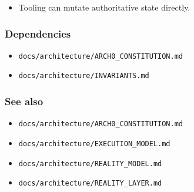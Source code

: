 \documentclass[9pt,a4paper,openany]{book}
\begin{document}
\begin{itemize}
\item Tooling can mutate authoritative state directly.\allowbreak{}
\end{itemize}





\subsubsection{Dependencies}


\begin{itemize}
\item \texttt{docs/\allowbreak{}architecture/\allowbreak{}ARCH0\_\allowbreak{}CONSTITUTION.\allowbreak{}md}
\end{itemize}


\begin{itemize}
\item \texttt{docs/\allowbreak{}architecture/\allowbreak{}INVARIANTS.\allowbreak{}md}
\end{itemize}





\subsubsection{See also}


\begin{itemize}
\item \texttt{docs/\allowbreak{}architecture/\allowbreak{}ARCH0\_\allowbreak{}CONSTITUTION.\allowbreak{}md}
\end{itemize}


\begin{itemize}
\item \texttt{docs/\allowbreak{}architecture/\allowbreak{}EXECUTION\_\allowbreak{}MODEL.\allowbreak{}md}
\end{itemize}


\begin{itemize}
\item \texttt{docs/\allowbreak{}architecture/\allowbreak{}REALITY\_\allowbreak{}MODEL.\allowbreak{}md}
\end{itemize}


\begin{itemize}
\item \texttt{docs/\allowbreak{}architecture/\allowbreak{}REALITY\_\allowbreak{}LAYER.\allowbreak{}md}
\end{itemize}
\end{document}
